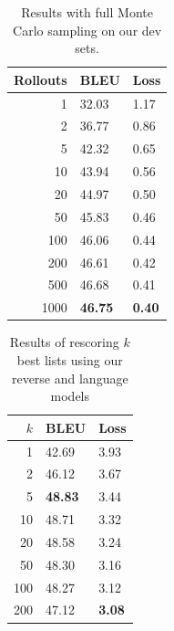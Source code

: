 \documentclass[11pt,a4paper]{article}
\begin{document}
\begin{table}
\centering
\begin{tabular}{r l l}
\toprule
Rollouts & BLEU & Loss \\
\midrule
1 & 32.03 & 1.17 \\
2 & 36.77 & 0.86 \\
5 & 42.32 & 0.65 \\
10 & 43.94 & 0.56 \\
20 & 44.97 & 0.50 \\
50 & 45.83 & 0.46 \\
100 & 46.06 & 0.44 \\
200 & 46.61 & 0.42 \\
500 & 46.68 & 0.41 \\
1000 & \textbf{46.75} & \textbf{0.40} \\
\bottomrule
\end{tabular}
\caption{Results with full Monte Carlo sampling on our dev sets.}
\label{tab:monte_carlo}
\end{table}

\begin{table}
\centering
\begin{tabular}{r l l}
\toprule
$k$ & BLEU & Loss \\
\midrule
1 & 42.69 & 3.93 \\
2 & 46.12 & 3.67 \\
5 & \textbf{48.83} & 3.44 \\
10 & 48.71 & 3.32 \\
20 & 48.58 & 3.24 \\
50 & 48.30 & 3.16 \\
100 & 48.27 & 3.12 \\
200 & 47.12 & \textbf{3.08} \\
\bottomrule
\end{tabular}
\caption{Results of rescoring $k$ best lists using our reverse and language models}
\label{tab:rescoring}
\end{table}
\end{document}
